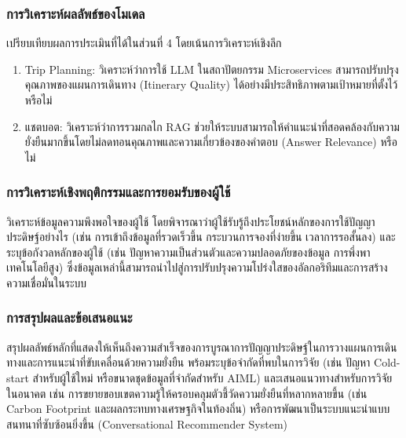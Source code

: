 \subsubsection{การวิเคราะห์ผลลัพธ์ของโมเดล}

เปรียบเทียบผลการประเมินที่ได้ในส่วนที่ 4 โดยเน้นการวิเคราะห์เชิงลึก
\begin{enumerate}[leftmargin=1.8cm]
\item Trip Planning: วิเคราะห์ว่าการใช้ LLM ในสถาปัตยกรรม Microservices สามารถปรับปรุงคุณภาพของแผนการเดินทาง (Itinerary Quality) ได้อย่างมีประสิทธิภาพตามเป้าหมายที่ตั้งไว้หรือไม่
\item แชตบอต: วิเคราะห์ว่าการรวมกลไก RAG ช่วยให้ระบบสามารถให้คำแนะนำที่สอดคล้องกับความยั่งยืนมากขึ้นโดยไม่ลดทอนคุณภาพและความเกี่ยวข้องของคำตอบ (Answer Relevance) หรือไม่
\end{enumerate}

\subsubsection{การวิเคราะห์เชิงพฤติกรรมและการยอมรับของผู้ใช้}

วิเคราะห์ข้อมูลความพึงพอใจของผู้ใช้ โดยพิจารณาว่าผู้ใช้รับรู้ถึงประโยชน์หลักของการใช้ปัญญาประดิษฐ์อย่างไร (เช่น การเข้าถึงข้อมูลที่รวดเร็วขึ้น กระบวนการจองที่ง่ายขึ้น เวลาการรอสั้นลง) และระบุข้อกังวลหลักของผู้ใช้ (เช่น ปัญหาความเป็นส่วนตัวและความปลอดภัยของข้อมูล การพึ่งพาเทคโนโลยีสูง) ซึ่งข้อมูลเหล่านี้สามารถนำไปสู่การปรับปรุงความโปร่งใสของอัลกอริทึมและการสร้างความเชื่อมั่นในระบบ

\subsubsection{การสรุปผลและข้อเสนอแนะ}

สรุปผลลัพธ์หลักที่แสดงให้เห็นถึงความสำเร็จของการบูรณาการปัญญาประดิษฐ์ในการวางแผนการเดินทางและการแนะนำที่ขับเคลื่อนด้วยความยั่งยืน พร้อมระบุข้อจำกัดที่พบในการวิจัย (เช่น ปัญหา Cold-start สำหรับผู้ใช้ใหม่ หรือขนาดชุดข้อมูลที่จำกัดสำหรับ AIML) และเสนอแนวทางสำหรับการวิจัยในอนาคต เช่น การขยายขอบเขตความรู้ให้ครอบคลุมตัวชี้วัดความยั่งยืนที่หลากหลายขึ้น (เช่น Carbon Footprint และผลกระทบทางเศรษฐกิจในท้องถิ่น) หรือการพัฒนาเป็นระบบแนะนำแบบสนทนาที่ซับซ้อนยิ่งขึ้น (Conversational Recommender System)
